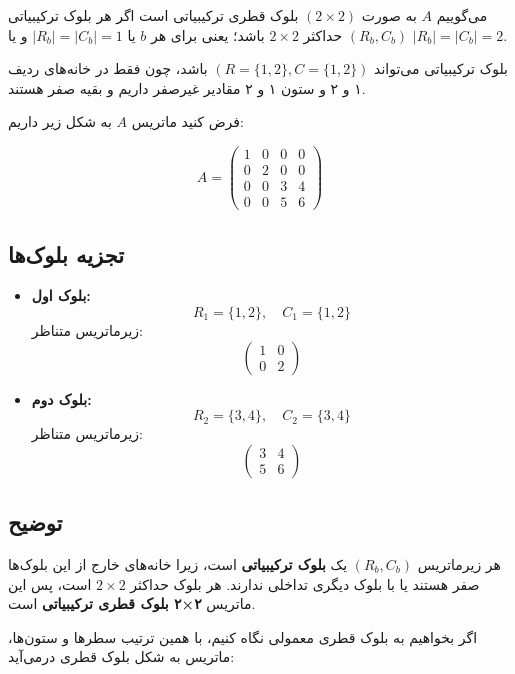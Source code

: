 می‌گوییم $A$ به صورت $(2 \times 2)$ بلوک قطری ترکیبیاتی است اگر هر بلوک ترکیبیاتی $(R_b, C_b)$ حداکثر $2 \times 2$ باشد؛ یعنی برای هر $b$ یا $|R_b| = |C_b| = 1$ و یا $|R_b| = |C_b| = 2$.



بلوک ترکیبیاتی می‌تواند $(R=\{1,2\}, C=\{1,2\})$ باشد،  
چون فقط در خانه‌های ردیف ۱ و ۲ و ستون ۱ و ۲ مقادیر غیرصفر داریم و بقیه صفر هستند.

   فرض کنید ماتریس $A$ به شکل زیر داریم:
   
   \[
   A =
   \begin{pmatrix}
   	1 & 0 & 0 & 0 \\
   	0 & 2 & 0 & 0 \\
   	0 & 0 & 3 & 4 \\
   	0 & 0 & 5 & 6
   \end{pmatrix}
   \]
   
   \subsection*{تجزیه بلوک‌ها}
   
   \begin{itemize}
   	\item \textbf{بلوک اول:}  
   	\[
   	R_1 = \{1,2\}, \quad C_1 = \{1,2\}
   	\]  
   	زیرماتریس متناظر:
   	\[
   	\begin{pmatrix}
   		1 & 0 \\
   		0 & 2
   	\end{pmatrix}
   	\]
   	
   	\item \textbf{بلوک دوم:}  
   	\[
   	R_2 = \{3,4\}, \quad C_2 = \{3,4\}
   	\]  
   	زیرماتریس متناظر:
   	\[
   	\begin{pmatrix}
   		3 & 4 \\
   		5 & 6
   	\end{pmatrix}
   	\]
   \end{itemize}
   
   \subsection*{توضیح}
   
   هر زیرماتریس $(R_b, C_b)$ یک \textbf{بلوک ترکیبیاتی} است، زیرا خانه‌های خارج از این بلوک‌ها صفر هستند یا با بلوک دیگری تداخلی ندارند.  
   هر بلوک حداکثر $2 \times 2$ است، پس این ماتریس \textbf{۲×۲ بلوک قطری ترکیبیاتی} است.  
   
   اگر بخواهیم به بلوک قطری معمولی نگاه کنیم، با همین ترتیب سطرها و ستون‌ها، ماتریس به شکل بلوک قطری درمی‌آید:
   
